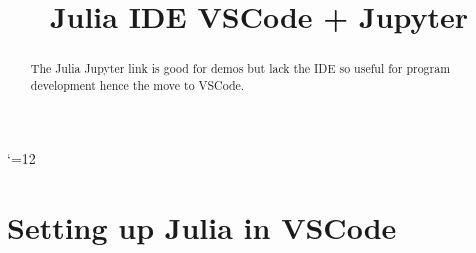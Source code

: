 \def\cdstrut{\vrule height .6\cdsep width 0pt depth .4\cdsep}
\def\@cdstrut{{\advance\cdsep by 2em\cdstrut}}

\def\arrow#1#2{
  \ifx d#1
    \llap{$\scriptstyle#2$}\left\downarrow\cdstrut\right.\@cdstrut\fi
  \ifx u#1
    \llap{$\scriptstyle#2$}\left\uparrow\cdstrut\right.\@cdstrut\fi
  \ifx r#1
    \mathop{\hbox to \cdsep{\rightarrowfill}}\limits^{#2}\fi
  \ifx l#1
    \mathop{\hbox to \cdsep{\leftarrowfill}}\limits^{#2}\fi
}
\catcode`\@=12

\pagestyle{plain}

\title{Julia  IDE VSCode + Jupyter}
\author{}


% 
\maketitle
\thispagestyle{empty}

\vspace{-.5cm}
\begin{abstract}   
 The Julia Jupyter link is good for demos but lack the IDE so useful for program development hence the move to VSCode.
 
 
\end{abstract}

\section{Setting up Julia in VSCode}

